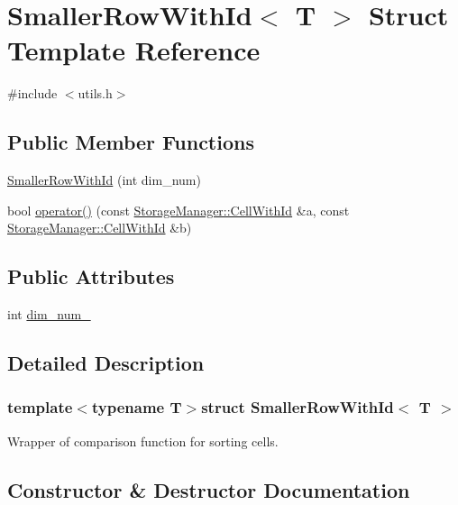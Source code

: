 \hypertarget{structSmallerRowWithId}{}\section{Smaller\+Row\+With\+Id$<$ T $>$ Struct Template Reference}
\label{structSmallerRowWithId}


{\ttfamily \#include $<$utils.\+h$>$}

\subsection*{Public Member Functions}
\begin{DoxyCompactItemize}
\item 
\hyperlink{structSmallerRowWithId_a627f6f2bc17f287a5c3a25b420f7caa3}{Smaller\+Row\+With\+Id} (int dim\+\_\+num)
\item 
bool \hyperlink{structSmallerRowWithId_a736334810a414162e6ec82516837c49d}{operator()} (const \hyperlink{structStorageManager_1_1CellWithId}{Storage\+Manager\+::\+Cell\+With\+Id} \&a, const \hyperlink{structStorageManager_1_1CellWithId}{Storage\+Manager\+::\+Cell\+With\+Id} \&b)
\end{DoxyCompactItemize}
\subsection*{Public Attributes}
\begin{DoxyCompactItemize}
\item 
int \hyperlink{structSmallerRowWithId_af3b974b33fc2edc8154fa937aaa47d42}{dim\+\_\+num\+\_\+}
\end{DoxyCompactItemize}


\subsection{Detailed Description}
\subsubsection*{template$<$typename T$>$struct Smaller\+Row\+With\+Id$<$ T $>$}

Wrapper of comparison function for sorting cells. 

\subsection{Constructor \& Destructor Documentation}
\hypertarget{structSmallerRowWithId_a627f6f2bc17f287a5c3a25b420f7caa3}{}
